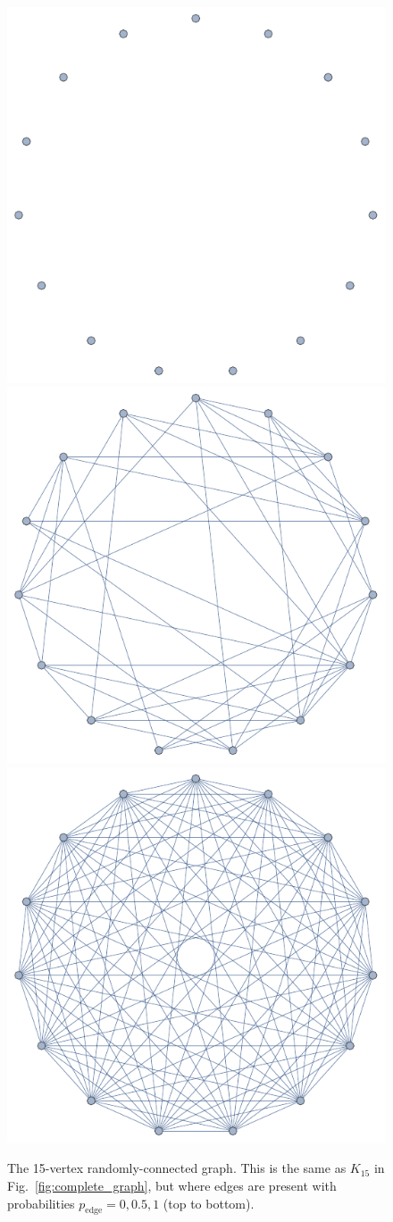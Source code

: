 \documentclass[aps, rmp, twocolumn, amsmath, amssymb, nofootinbib, superscriptaddress, longbibliography, floatfix, table-of-contents, eqsecnum]{revtex4-1}
\begin{document}
\begin{figure}[!htb]
\includegraphics[width=0.6\columnwidth]{random_0}
\includegraphics[width=0.6\columnwidth]{random_05}
\includegraphics[width=0.6\columnwidth]{random_1}
\caption{The 15-vertex randomly-connected graph. This is the same as $K_{15}$ in Fig.~\ref{fig:complete_graph}, but where edges are present with probabilities \mbox{$p_\text{edge}=0,0.5,1$} (top to bottom).} \label{fig:random_graph}
\end{figure}
\end{document}

